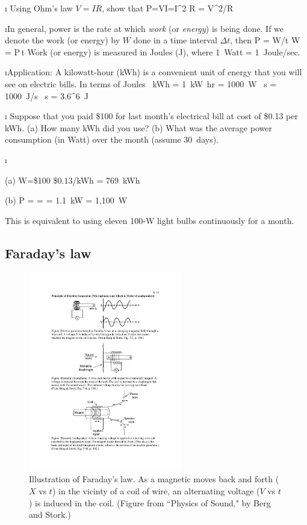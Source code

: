 \i \exer
Using Ohm's law $V=IR$, show that
%
\be
P=VI=I^2 R = V^2/R
\ee

\i In general, power is the rate at which {\em work} (or {\em energy})
is  being done. 
If we denote the work (or energy) by $W$ done in a time interval
$\Delta t$, then
%
\be
P = W/\Delta t
\quad
W = P\,\Delta t
\ee
%
Work (or energy) is measured in Joules (J), where 1~Watt =
1~Joule/sec.

\i Application: A kilowatt-hour (kWh) is a convenient unit of 
energy that you will see on electric bills.
In terms of Joules
%
~{\rm kWh}
= 1~{\rm kW}~{\rm hr}
= 1000~{\rm W} ~{\rm s}
= 1000~{\rm J/s} ~{\rm s}
= 3.6^6~{\rm J}
\ee

\i \exer 
Suppose that you paid \$100 for last month's electrical bill
at cost of \$0.13 per kWh.
(a) How many kWh did you use? 
(b) What was the average power consumption (in Watt) over 
the month (assume 30~days).

\i \ans

(a) 
\be 
W=\$100 \div \$0.13/{\rm kWh} = 769~{\rm kWh}
\ee 

(b)
\be
P =  
=  
= 1.1~{\rm kW} 
= 1,100~{\rm W}
\ee

This is equivalent to using eleven 100-W light bulbs 
continuously for a month.
 
\ei

%
\subsection{Faraday's law}

%
\begin{figure}[htbp]
\begin{center}
\includegraphics[width=0.6\textwidth]{faraday}
\caption{Illustration of Faraday's law.
As a magnetic moves back and forth ($X$ vs $t$) in the vicinty 
of a coil of wire, an alternating voltage ($V$ vs $t$) is induced
in the coil.
(Figure from ``Physics of Sound," by Berg and Stork.)} 
\label{f:faraday}
\end{center}
\end{figure}
%

